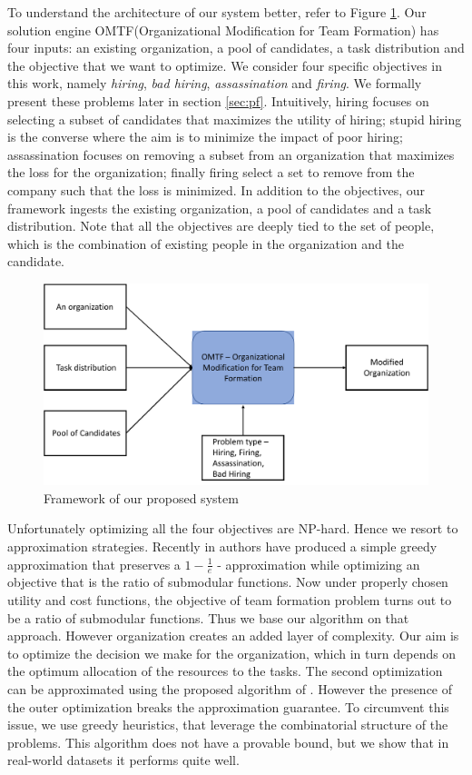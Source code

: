 To understand the architecture of our system better, refer to Figure \ref{fig:hpo}. Our solution engine OMTF(Organizational Modification for Team Formation) has four inputs: an existing organization, a pool of candidates, a task distribution and the objective that we want to optimize. We consider four specific objectives in this work, namely \textit{hiring}, \textit{bad hiring}, \textit{assassination} and \textit{firing}. We formally present these problems later in section \ref{sec:pf}. Intuitively, hiring focuses on selecting a subset of candidates that maximizes the utility of hiring; stupid hiring is the converse where the aim is to minimize the impact of poor hiring; assassination focuses on removing a subset from an organization that maximizes the loss for the organization; finally firing select a set to remove from the company such that the loss is minimized. In addition to the objectives, our framework ingests the existing organization, a pool of candidates and a task distribution. Note that all the objectives are deeply tied to the set of people, which is the combination of existing people in the organization and the candidate.
\begin{figure}[h]
\centering
\begin{small}
\includegraphics[width=1.0\textwidth]{figs/illustration.pdf}
\caption{Framework of our proposed system}
\label{fig:hpo}
\end{small}
\end{figure} 

Unfortunately optimizing all the four objectives are NP-hard. Hence we resort to approximation strategies. Recently in \cite{bai2016algorithms} authors have produced a simple greedy approximation that preserves a $1 - \frac{1}{e}$ - approximation while optimizing an objective that is the ratio of submodular functions. Now under properly chosen utility and cost functions, the objective of team formation problem turns out to be a ratio of submodular functions. Thus we base our algorithm on that approach. However organization creates an added layer of complexity. Our aim is to optimize the decision we make for the organization, which in turn depends on the optimum allocation of the resources to the tasks. The second optimization can be approximated using the proposed algorithm of \cite{bai2016algorithms}. However the presence of the outer optimization breaks the approximation guarantee. To circumvent this issue, we use greedy heuristics, that leverage the combinatorial structure of the problems. This algorithm does not have a provable bound, but we show that in real-world datasets it performs quite well.

